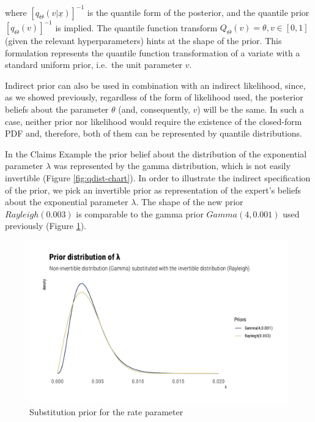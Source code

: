 \documentclass[
  12pt,
]{article}
\begin{document}
where \([q_\Theta(v|\underline{x})]^{-1}\) is the quantile form of the posterior, and the quantile prior \([q_\Theta(v)]^{-1}\) is implied. The quantile function transform \(Q_\Theta(v)=\theta,v \in [0,1]\) (given the relevant hyperparameters) hints at the shape of the prior. This formulation represents the quantile function transformation of a variate with a standard uniform prior, i.e.~the unit parameter \(v\).

Indirect prior can also be used in combination with an indirect likelihood, since, as we showed previously, regardless of the form of likelihood used, the posterior beliefs about the parameter \(\theta\) (and, consequently, \(v\)) will be the same. In such a case, neither prior nor likelihood would require the existence of the closed-form PDF and, therefore, both of them can be represented by quantile distributions.

In the Claims Example the prior belief about the distribution of the exponential parameter \(\lambda\) was represented by the gamma distribution, which is not easily invertible (Figure \ref{fig:qdist-chart}). In order to illustrate the indirect specification of the prior, we pick an invertible prior as representation of the expert's beliefs about the exponential parameter \(\lambda\). The shape of the new prior \(Rayleigh(0.003)\) is comparable to the gamma prior \(Gamma(4,0.001)\) used previously (Figure \ref{fig:gamma-ray-prior-graph}).

\begin{figure}

{\centering \includegraphics[width=0.8\linewidth]{ilbm_article_files/figure-latex/gamma-ray-prior-graph-1} 

}

\caption{Substitution prior for the rate parameter}\label{fig:gamma-ray-prior-graph}
\end{figure}
\end{document}
